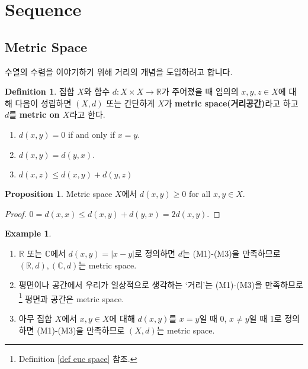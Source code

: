 \documentclass[12pt]{article}
\theoremstyle{definition}
\newtheorem{prop}[thm]{Proposition}
\newtheorem{defn}[thm]{Definition}
\newtheorem*{ex}{Example}
\def\RR{\mathbb{R}}
\def\CC{\mathbb{C}}
\newcommand{\abs}[1]{\left\vert#1\right\vert}
\begin{document}
\section{Sequence} \label{sec sequence}

\subsection{Metric Space} \label{sec metric space}

수열의 수렴을 이야기하기 위해 거리의 개념을 도입하려고 합니다.

	\begin{defn} \label{metric}
		집합 \(X\)와 함수 \(d: X \times X \rightarrow \RR\)가 주어졌을 때 임의의 \(x, y, z \in X\)에 대해 다음이 성립하면 \((X, d)\) 또는 간단하게 \(X\)가 \textbf{metric space(거리공간)}라고 하고 \(d\)를 \textbf{metric on \(X\)}라고 한다.
		\begin{enumerate} [label=(M\arabic*), leftmargin=2\parindent]
			\item
			\(d(x, y) = 0\) if and only if \(x = y\).
			\item
			\(d(x, y) = d(y, x)\).
			\item
			\(d(x, z) \le d(x, y) + d(y, z)\)
		\end{enumerate}
	\end{defn}

	\begin{prop}
		Metric space \(X\)에서 \(d(x, y) \ge 0\) for all \(x, y \in X\).
	\end{prop}
	\begin{proof}
		\(0 = d(x, x) \le d(x, y) + d(y, x) = 2d(x, y)\).
	\end{proof}

	\begin{ex}
		\quad
		\begin{enumerate} [label=(\alph*), leftmargin=2\parindent]
			\item
			\(\RR\) 또는 \(\CC\)에서 \(d(x, y) = \abs{x - y}\)로 정의하면 \(d\)는 (M1)-(M3)을 만족하므로 \((\RR, d), (\CC, d)\)는 metric space.
			\item
			평면이나 공간에서 우리가 일상적으로 생각하는 `거리'는 (M1)-(M3)을 만족하므로\footnote{Definition \ref{def euc space} 참조.} 평면과 공간은 metric space.
			\item
			아무 집합 \(X\)에서 \(x, y \in X\)에 대해 \(d(x, y)\)를 \(x = y\)일 때 0, \(x \neq y\)일 때 1로 정의하면 (M1)-(M3)을 만족하므로 \((X, d)\)는 metric space.
		\end{enumerate}
	\end{ex}
\end{document}
